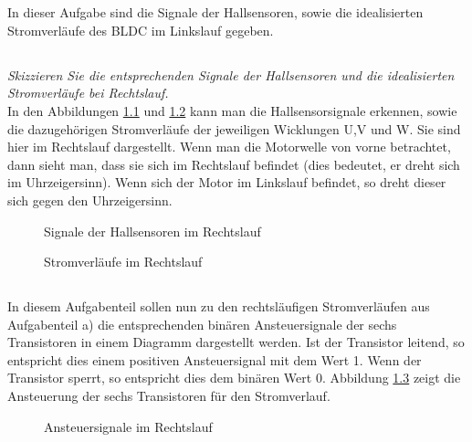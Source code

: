 
\chapter{}\label{ch:auf2}
In dieser Aufgabe sind die Signale der Hallsensoren, sowie die idealisierten Stromverläufe des BLDC im Linkslauf gegeben.

\section{}\label{sec:2a}
\textit{Skizzieren Sie die entsprechenden Signale der Hallsensoren und die idealisierten Stromverläufe bei Rechtslauf.}\\
In den Abbildungen \ref{fig:2a:hall} und \ref{fig:2a:strom} kann man die Hallsensorsignale erkennen, sowie die dazugehörigen Stromverläufe der jeweiligen Wicklungen U,V und W. Sie sind hier im Rechtslauf dargestellt. Wenn man die Motorwelle von vorne betrachtet, dann sieht man, dass sie sich im Rechtslauf befindet (dies bedeutet, er dreht sich im Uhrzeigersinn). Wenn sich der Motor im Linkslauf befindet, so dreht dieser sich gegen den Uhrzeigersinn.
\begin{figure}[h]
	\centering
	
	\caption{Signale der Hallsensoren im Rechtslauf}
	\label{fig:2a:hall}
\end{figure}
\begin{figure}[h]
	\centering
	
	\caption{Stromverläufe im Rechtslauf}
	\label{fig:2a:strom}
\end{figure}

\section{}\label{sec:2b}
In diesem Aufgabenteil sollen nun zu den rechtsläufigen Stromverläufen aus Aufgabenteil a) die entsprechenden binären Ansteuersignale der sechs Transistoren in einem Diagramm dargestellt werden. Ist der Transistor leitend, so entspricht dies einem positiven Ansteuersignal mit dem Wert 1. Wenn der Transistor sperrt, so entspricht dies dem binären Wert 0. Abbildung \ref{fig:2b:rechts} zeigt die Ansteuerung der sechs Transistoren für den Stromverlauf.
\begin{figure}[h]
	\centering
	
	\caption{Ansteuersignale im Rechtslauf}
	\label{fig:2b:rechts}
\end{figure}

